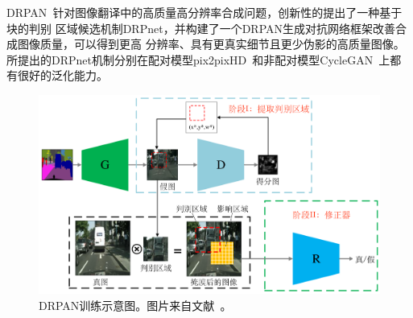 




DRPAN~\cite{wang2019discriminative}针对图像翻译中的高质量高分辨率合成问题，创新性的提出了一种基于块的判别 区域候选机制DRPnet，并构建了一个DRPAN生成对抗网络框架改善合成图像质量，可以得到更高 分辨率、具有更真实细节且更少伪影的高质量图像。所提出的DRPnet机制分别在配对模型pix2pixHD~\cite{wang2018high}和非配对模型CycleGAN~\cite{zhu2017unpaired}上都有很好的泛化能力。

\begin{figure}[ht]
    \centering
	\includegraphics[width=\textwidth]{figures/DRPAN.pdf}
	\caption{DRPAN训练示意图。图片来自文献~\cite{wang2019discriminative}。}
	\label{fig:drpan}
\end{figure}


